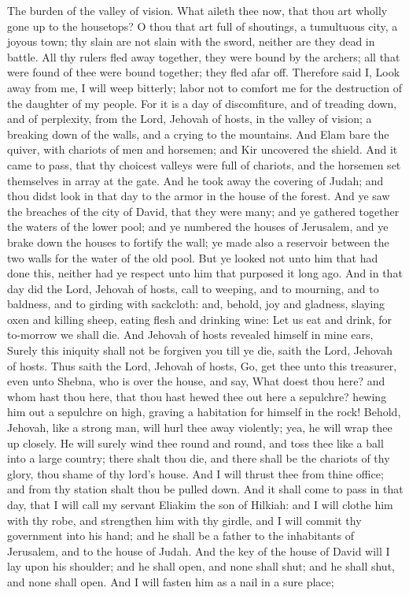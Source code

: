 The burden of the valley of vision. What aileth thee now, that thou art wholly gone up to the housetops? O thou that art full of shoutings, a tumultuous city, a joyous town; thy slain are not slain with the sword, neither are they dead in battle. All thy rulers fled away together, they were bound by the archers; all that were found of thee were bound together; they fled afar off. Therefore said I, Look away from me, I will weep bitterly; labor not to comfort me for the destruction of the daughter of my people.  For it is a day of discomfiture, and of treading down, and of perplexity, from the Lord, Jehovah of hosts, in the valley of vision; a breaking down of the walls, and a crying to the mountains. And Elam bare the quiver, with chariots of men and horsemen; and Kir uncovered the shield. And it came to pass, that thy choicest valleys were full of chariots, and the horsemen set themselves in array at the gate. And he took away the covering of Judah; and thou didst look in that day to the armor in the house of the forest. And ye saw the breaches of the city of David, that they were many; and ye gathered together the waters of the lower pool; and ye numbered the houses of Jerusalem, and ye brake down the houses to fortify the wall; ye made also a reservoir between the two walls for the water of the old pool. But ye looked not unto him that had done this, neither had ye respect unto him that purposed it long ago.  And in that day did the Lord, Jehovah of hosts, call to weeping, and to mourning, and to baldness, and to girding with sackcloth: and, behold, joy and gladness, slaying oxen and killing sheep, eating flesh and drinking wine: Let us eat and drink, for to-morrow we shall die. And Jehovah of hosts revealed himself in mine ears, Surely this iniquity shall not be forgiven you till ye die, saith the Lord, Jehovah of hosts.  Thus saith the Lord, Jehovah of hosts, Go, get thee unto this treasurer, even unto Shebna, who is over the house, and say, What doest thou here? and whom hast thou here, that thou hast hewed thee out here a sepulchre? hewing him out a sepulchre on high, graving a habitation for himself in the rock! Behold, Jehovah, like a strong man, will hurl thee away violently; yea, he will wrap thee up closely. He will surely wind thee round and round, and toss thee like a ball into a large country; there shalt thou die, and there shall be the chariots of thy glory, thou shame of thy lord’s house. And I will thrust thee from thine office; and from thy station shalt thou be pulled down. And it shall come to pass in that day, that I will call my servant Eliakim the son of Hilkiah: and I will clothe him with thy robe, and strengthen him with thy girdle, and I will commit thy government into his hand; and he shall be a father to the inhabitants of Jerusalem, and to the house of Judah. And the key of the house of David will I lay upon his shoulder; and he shall open, and none shall shut; and he shall shut, and none shall open. And I will fasten him as a nail in a sure place; 